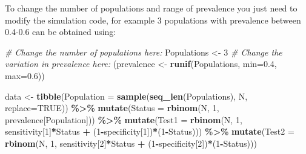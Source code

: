 \documentclass[
  ignorenonframetext,
]{beamer}
\newenvironment{Shaded}{\begin{snugshade}}{\end{snugshade}}
\newcommand{\AttributeTok}[1]{\textcolor[rgb]{0.13,0.29,0.53}{#1}}
\newcommand{\CommentTok}[1]{\textcolor[rgb]{0.56,0.35,0.01}{\textit{#1}}}
\newcommand{\ConstantTok}[1]{\textcolor[rgb]{0.56,0.35,0.01}{#1}}
\newcommand{\DecValTok}[1]{\textcolor[rgb]{0.00,0.00,0.81}{#1}}
\newcommand{\FloatTok}[1]{\textcolor[rgb]{0.00,0.00,0.81}{#1}}
\newcommand{\FunctionTok}[1]{\textcolor[rgb]{0.13,0.29,0.53}{\textbf{#1}}}
\newcommand{\NormalTok}[1]{#1}
\newcommand{\OtherTok}[1]{\textcolor[rgb]{0.56,0.35,0.01}{#1}}
\newcommand{\SpecialCharTok}[1]{\textcolor[rgb]{0.81,0.36,0.00}{\textbf{#1}}}
\begin{document}
\begin{frame}[fragile]
To change the number of populations and range of prevalence you just
need to modify the simulation code, for example 3 populations with
prevalence between 0.4-0.6 can be obtained using:

\scriptsize

\begin{Shaded}
\begin{Highlighting}[]
\CommentTok{\# Change the number of populations here:}
\NormalTok{Populations }\OtherTok{\textless{}{-}} \DecValTok{3}
\CommentTok{\# Change the variation in prevalence here:}
\NormalTok{(prevalence }\OtherTok{\textless{}{-}} \FunctionTok{runif}\NormalTok{(Populations, }\AttributeTok{min=}\FloatTok{0.4}\NormalTok{, }\AttributeTok{max=}\FloatTok{0.6}\NormalTok{))}

\NormalTok{data }\OtherTok{\textless{}{-}} \FunctionTok{tibble}\NormalTok{(}\AttributeTok{Population =} \FunctionTok{sample}\NormalTok{(}\FunctionTok{seq\_len}\NormalTok{(Populations), N, }\AttributeTok{replace=}\ConstantTok{TRUE}\NormalTok{)) }\SpecialCharTok{\%\textgreater{}\%}
  \FunctionTok{mutate}\NormalTok{(}\AttributeTok{Status =} \FunctionTok{rbinom}\NormalTok{(N, }\DecValTok{1}\NormalTok{, prevalence[Population])) }\SpecialCharTok{\%\textgreater{}\%}
  \FunctionTok{mutate}\NormalTok{(}\AttributeTok{Test1 =} \FunctionTok{rbinom}\NormalTok{(N, }\DecValTok{1}\NormalTok{, sensitivity[}\DecValTok{1}\NormalTok{]}\SpecialCharTok{*}\NormalTok{Status }\SpecialCharTok{+}\NormalTok{ (}\DecValTok{1}\SpecialCharTok{{-}}\NormalTok{specificity[}\DecValTok{1}\NormalTok{])}\SpecialCharTok{*}\NormalTok{(}\DecValTok{1}\SpecialCharTok{{-}}\NormalTok{Status))) }\SpecialCharTok{\%\textgreater{}\%}
  \FunctionTok{mutate}\NormalTok{(}\AttributeTok{Test2 =} \FunctionTok{rbinom}\NormalTok{(N, }\DecValTok{1}\NormalTok{, sensitivity[}\DecValTok{2}\NormalTok{]}\SpecialCharTok{*}\NormalTok{Status }\SpecialCharTok{+}\NormalTok{ (}\DecValTok{1}\SpecialCharTok{{-}}\NormalTok{specificity[}\DecValTok{2}\NormalTok{])}\SpecialCharTok{*}\NormalTok{(}\DecValTok{1}\SpecialCharTok{{-}}\NormalTok{Status)))}


\end{Highlighting}
\end{Shaded}
\end{frame}
\end{document}
